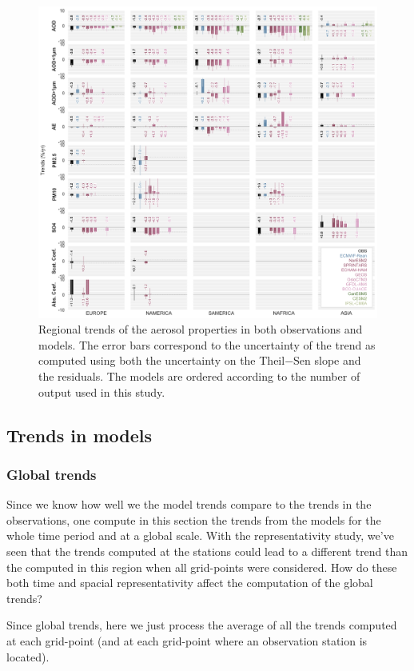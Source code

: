 \documentclass[journal abbreviation, manuscript]{copernicus}
\begin{document}
\begin{figure}[t]
 \includegraphics[width=16cm]{../scripts/figs/heatmaps/BARS.png}
 \caption{Regional trends of the aerosol properties in both observations and models. The error bars correspond to the uncertainty of the trend as computed using both the uncertainty on the Theil−Sen slope and the residuals. The models are ordered according to the number of output used in this study.}
 \label{bars}
\end{figure}

\subsection{Trends in models}

\subsubsection{Global trends}
Since we know how well we the model trends compare to the trends in the observations, one compute in this section the trends from the models for the whole time period and at a global scale. With the representativity study, we've seen that the trends computed at the stations could lead to a different trend than the computed in this region when all grid-points were considered. How do these both time and spacial representativity affect the computation of the global trends?

Since global trends, here we just process the average of all the trends computed at each grid-point (and at each grid-point where an observation station is located).
\end{document}
